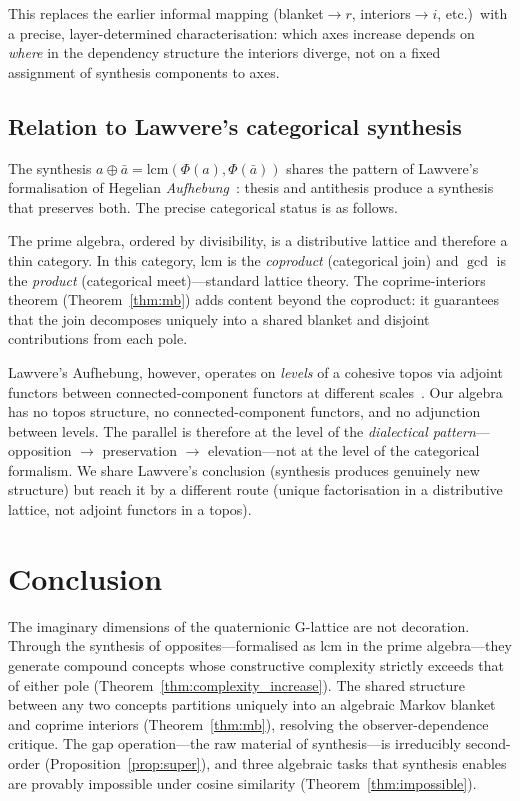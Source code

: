 \documentclass[11pt,a4paper]{article}
\begin{document}
This replaces the earlier informal mapping (blanket$\to r$,
interiors$\to i$, etc.)\ with a precise, layer-determined
characterisation: which axes increase depends on \emph{where} in
the dependency structure the interiors diverge, not on a fixed
assignment of synthesis components to axes.

\subsection{Relation to Lawvere's categorical synthesis}

The synthesis $a\oplus\bar{a}=\mathrm{lcm}(\Phi(a),\Phi(\bar{a}))$
shares the pattern of Lawvere's formalisation of Hegelian
\emph{Aufhebung}~\citep{lawvere1969,lawvere1996}: thesis and
antithesis produce a synthesis that preserves both. The precise
categorical status is as follows.

The prime algebra, ordered by divisibility, is a distributive
lattice and therefore a thin category. In this category,
$\mathrm{lcm}$ is the \emph{coproduct} (categorical join) and
$\gcd$ is the \emph{product} (categorical meet)---standard lattice
theory. The coprime-interiors theorem (Theorem~\ref{thm:mb}) adds
content beyond the coproduct: it guarantees that the join
decomposes uniquely into a shared blanket and disjoint
contributions from each pole.

Lawvere's Aufhebung, however, operates on \emph{levels} of a
cohesive topos via adjoint functors between connected-component
functors at different scales~\citep{lawvere1996}. Our algebra has
no topos structure, no connected-component functors, and no
adjunction between levels. The parallel is therefore at the level
of the \emph{dialectical pattern}---opposition $\to$ preservation
$\to$ elevation---not at the level of the categorical
formalism. We share Lawvere's conclusion (synthesis produces
genuinely new structure) but reach it by a different route
(unique factorisation in a distributive lattice, not adjoint
functors in a topos).

\section{Conclusion}
\label{sec:conclusion}

The imaginary dimensions of the quaternionic G-lattice are not
decoration. Through the synthesis of opposites---formalised as
$\mathrm{lcm}$ in the prime algebra---they generate compound
concepts whose constructive complexity strictly exceeds that of
either pole (Theorem~\ref{thm:complexity_increase}). The shared
structure between any two concepts partitions uniquely into an
algebraic Markov blanket and coprime interiors
(Theorem~\ref{thm:mb}), resolving the observer-dependence critique.
The gap operation---the raw material of synthesis---is irreducibly
second-order (Proposition~\ref{prop:super}), and three algebraic
tasks that synthesis enables are provably impossible under cosine
similarity (Theorem~\ref{thm:impossible}).
\end{document}
